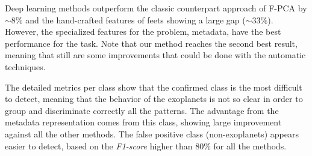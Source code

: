 Deep learning methods outperform the classic counterpart approach of F-PCA by $\sim 8\%$ and the hand-crafted features of feets showing a large gap ($\sim 33\%$). 
However, the specialized features for the problem, metadata, have the best performance for the task. 
Note that our method reaches the second best result, meaning that still are some improvements that could be done with the automatic techniques.

The detailed metrics per class show that the confirmed class is the most difficult to detect, meaning that the behavior of the exoplanets is not so clear in order to group and discriminate correctly all the patterns. 
The advantage from the metadata representation comes from this class, showing large improvement against all the other methods. 
The false positive class (non-exoplanets) appears easier to detect, based on the \textit{F1-score} higher than 80\% for all the methods. 

